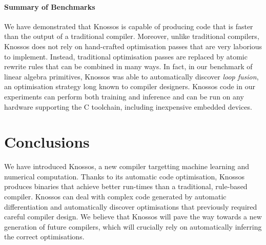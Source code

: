 \documentclass[fullpage,twocolumn]{article} %
\def\Cpp{{C\nolinebreak[4]\hspace{-.05em}\raisebox{.4ex}{\tiny\bf ++}} }
\begin{document}




\paragraph{Summary of Benchmarks}
We have demonstrated that Knossos is capable of producing code that is faster than the output of a traditional compiler. Moreover, unlike traditional compilers, Knossos does not rely on hand-crafted optimisation passes that are very laborious to implement. Instead, traditional optimisation passes are replaced by atomic rewrite rules that can be combined in many ways.
In fact, in our benchmark of linear algebra primitives, Knossos was able to automatically discover \emph{loop fusion}, an optimisation strategy long known to compiler designers. Knossos code in our experiments can perform both training and inference and can be run on any hardware supporting the \Cpp toolchain, including inexpensive embedded devices. 


\section{Conclusions}
We have introduced Knossos, a new compiler targetting machine learning and numerical computation. Thanks to its automatic code optimisation, Knossos produces binaries that achieve better run-times than a traditional, rule-based compiler. Knossos can deal with complex code generated by automatic differentiation and automatically discover  optimisations that previously required careful compiler design. We believe that Knossos will pave the way towards a new generation of future compilers, which will crucially rely on automatically inferring the correct optimisations. 
\end{document}
